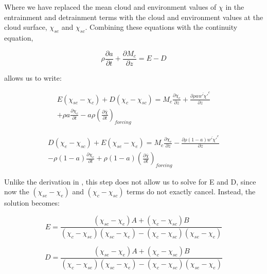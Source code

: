 \documentclass[12pt]{article}
\begin{document}
Where we have replaced the mean cloud and environment values of $\chi$ in the 
entrainment and detrainment terms with the cloud and environment 
values at the cloud surface, $\chi_{se}$ and $\chi_{sc}$.  Combining these 
equations with the continuity equation, 

\begin{equation}
    \label{eq:continuity}
    \rho \frac{\partial a}{\partial t} 
    + \frac{\partial M_c}{\partial z}
    = E - D
\end{equation}

allows us to write:

\begin{equation}
  \label{eq:entrainment_2}
  \begin{split}
    E (\chi_{se} - \chi_c) + D (\chi_c - \chi_{sc}) 
    = M_c \frac{\partial \chi_c}{\partial z}
    + \frac{\partial \rho a \overline{w' \chi'}^c}{\partial z} \\
    + \rho a \frac{\partial \chi_c}{\partial t}
    - a \rho \left(\frac{\partial \bar{\chi}}{\partial t}\right)_{forcing}
  \end{split}
\end{equation}

\begin{equation}
  \label{eq:detrainment_2}
  \begin{split}
    D (\chi_e - \chi_{sc}) + E (\chi_{se} - \chi_e)
    = M_c \frac{\partial \chi_e}{\partial z}
    - \frac{\partial \rho (1 - a) \overline{w' \chi'}^e}{\partial z} \\
    - \rho (1 - a) \frac{\partial \chi_e}{\partial t}
    + \rho (1 - a) \left(\frac{\partial \bar{\chi}}{\partial t}\right)_{forcing}
  \end{split}
\end{equation}

Unlike the derivation in \cite{Siebesma1995}, this step does not allow us to 
solve for E and D, since now the $(\chi_{se} - \chi_e)$ and 
$(\chi_c - \chi_{sc})$ terms do not exactly cancel.  Instead, the solution 
becomes:

\begin{equation}
  \label{eq:final_entrainment}
    E = \frac{(\chi_{sc} - \chi_e)A + (\chi_c - \chi_{sc})B}
             {(\chi_c - \chi_{se})(\chi_{sc} - \chi_e) 
            - (\chi_c - \chi_{sc})(\chi_{se} - \chi_e)}
\end{equation}

\begin{equation}
  \label{eq:final_detrainment}
    D = \frac{(\chi_{se} - \chi_e)A + (\chi_c - \chi_{se})B}
             {(\chi_c - \chi_{se})(\chi_{sc} - \chi_e) 
            - (\chi_c - \chi_{sc})(\chi_{se} - \chi_e)}
\end{equation}
\end{document}
